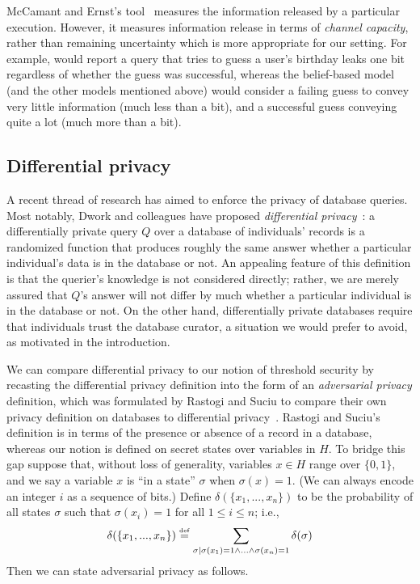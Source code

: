 McCamant and Ernst's \flowcheck{} tool~\cite{McCamantE2008} measures
the information released by a particular execution.  However, it
measures information release in terms of \emph{channel capacity},
rather than remaining uncertainty which is more appropriate for our
setting.  For example, \flowcheck{} would report a query that tries to
guess a user's birthday leaks one bit regardless of whether the guess
was successful, whereas the belief-based model (and the other models
mentioned above) would consider a failing guess to convey very little
information (much less than a bit), and a successful guess conveying
quite a lot (much more than a bit).  

\subsection{Differential privacy}
\label{sec:diffpriv}

A recent thread of research has aimed to enforce the privacy of
database queries.  Most notably, Dwork and colleagues have proposed
\emph{differential privacy}~\cite{diffpriv}: a differentially private
query $Q$ over a database of individuals' records is a randomized
function that produces roughly the same answer whether a particular
individual's data is in the database or not.  An appealing feature of
this definition is that the querier's knowledge is not considered
directly; rather, we are merely assured that $Q$'s answer will not
differ by much whether a particular individual is in the database or
not. On the other hand, differentially private databases require that
individuals trust the database curator, a situation we would prefer to
avoid, as motivated in the introduction.

We can compare differential privacy to our notion of threshold
security by recasting the differential privacy definition into the
form of an \emph{adversarial privacy} definition, which was formulated
by Rastogi and Suciu to compare their own privacy definition on
databases to differential privacy~\cite{rastogi09relationship}.
Rastogi and Suciu's definition is in terms of the presence or
absence of a record in a database, whereas our notion is defined on
secret states over variables in $H$.  To bridge this gap suppose that,
without loss of generality, variables $x \in H$ range over $\{ 0, 1
\}$, and we say a variable $x$ is ``in a state'' $\sigma$ when
$\sigma(x) = 1$. (We can always encode an integer $i$ as a sequence of
bits.)  Define $\delta(\{x_1,...,x_n\})$ to be the probability of all
states $\sigma$ such that $\sigma(x_i) = 1$ for all $1 \leq i \leq n$;
i.e.,
$$\delta(\{x_1,...,x_n\}) \stackrel{\smash{\scriptscriptstyle \mathrm{def}}}= 
\sum_{\sigma \mid
  \sigma(x_1) = 1 \wedge ... \wedge \sigma(x_n) = 1} \delta(\sigma) 
$$
Then we can state adversarial privacy as follows.

